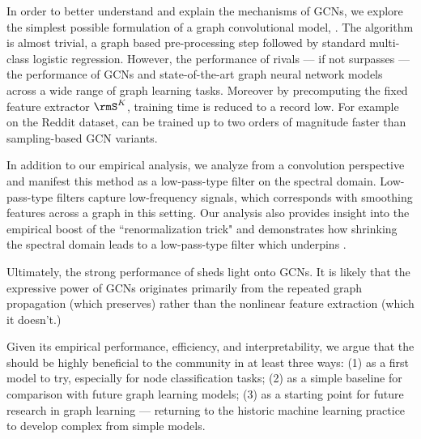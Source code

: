 In order to better understand and explain the mechanisms of GCNs, we explore the simplest possible formulation of a graph convolutional model, \method{}. The algorithm is almost trivial, a graph based pre-processing step  followed by standard multi-class logistic regression. However, the performance of \method{} rivals --- if not surpasses --- the performance of GCNs and state-of-the-art graph neural network models across a wide range of graph learning tasks.
Moreover by precomputing the fixed feature extractor $\rmS^K$, training time is reduced to a record low.
For example on the Reddit dataset, \method{} can be trained up to two orders of magnitude faster than sampling-based GCN variants. 

In addition to our empirical analysis, we analyze \method{} from a convolution perspective and manifest this method as a low-pass-type filter on the spectral domain. Low-pass-type filters capture low-frequency signals, which corresponds with smoothing features across a graph in this setting. 
Our analysis also provides insight into the empirical boost of the ``renormalization trick" and demonstrates how shrinking the spectral domain leads to a low-pass-type filter which underpins \method{}. 

Ultimately, the strong performance of \method{} sheds light onto GCNs. It is likely that the expressive power of GCNs originates primarily from the repeated graph propagation (which \method{} preserves) rather than the nonlinear feature extraction (which it doesn't.) 

Given its empirical performance, efficiency, and interpretability, we argue that the \method{} should be highly beneficial to the community in at least three ways:
(1) as a first model to try, especially for node classification tasks; 
(2) as a simple baseline for comparison with future graph learning models; 
(3) as a starting point for future research in graph learning --- returning to the historic machine learning practice to develop complex from simple models. 

